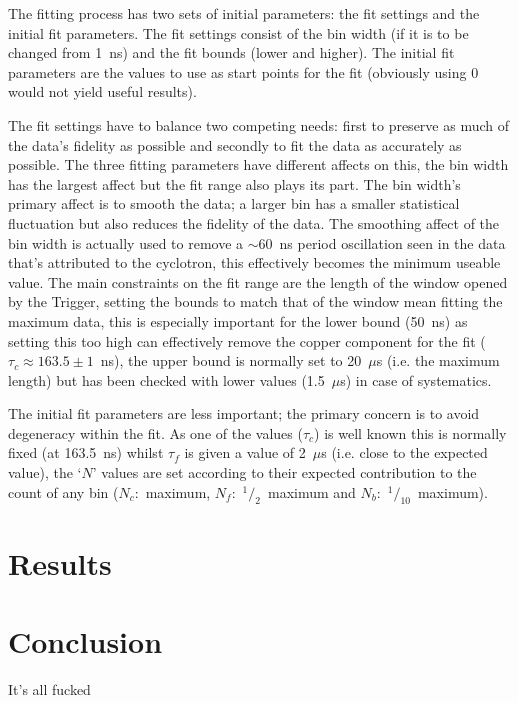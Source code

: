 \documentclass[]{article}
\newcommand{\ms}{$\mu$s}
\begin{document}
The fitting process has two sets of initial parameters: the fit settings and the initial fit parameters. The fit settings consist of the bin width (if it is to be changed from 1~ns) and the fit bounds (lower and higher). The initial fit parameters are the values to use as start points for the fit (obviously using 0 would not yield useful results).

The fit settings have to balance two competing needs: first to preserve as much of the data's fidelity as possible and secondly to fit the data as accurately as possible. The three fitting parameters have different affects on this, the bin width has the largest affect but the fit range also plays its part. The bin width's primary affect is to smooth the data; a larger bin has a smaller statistical fluctuation but also reduces the fidelity of the data. The smoothing affect of the bin width is actually used to remove a $\sim$60~ns period oscillation seen in the data that's attributed to the cyclotron, this effectively becomes the minimum useable value. The main constraints on the fit range are the length of the window opened by the Trigger, setting the bounds to match that of the window mean fitting the maximum data, this is especially important for the lower bound (50~ns) as setting this too high can effectively remove the copper component for the fit ($\tau_{c}\approx163.5\pm1$~ns), the upper bound is normally set to 20~\ms{}  (i.e. the maximum length) but has been checked with lower values (1.5~\ms) in case of systematics.

The initial fit parameters are less important; the primary concern is to avoid degeneracy within the fit. As one of the values ($\tau_{c}$) is well known this is normally fixed (at 163.5~ns) whilst $\tau_{f}$ is given a value of 2~\ms{} (i.e. close to the expected value), the `$N$' values are set according to their expected contribution to the count of any bin ($N_{c}$:~maximum, $N_{f}$:~$^1/_2$~maximum and $N_{b}$:~$^1/_{10}$~maximum).

\section{Results}\label{sec:results}
\section{Conclusion}\label{sec:conclusion}
It's all fucked



\end{document}
